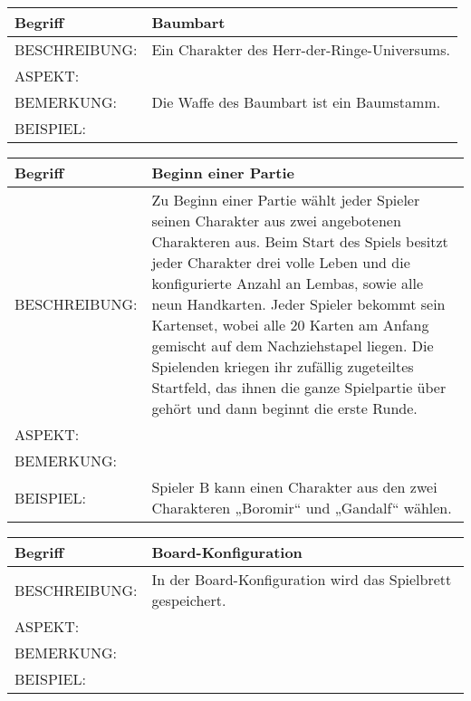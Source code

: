 \documentclass{uulm-assignment}
\begin{document}
	     \begin{tabularx}{\textwidth}{|l|X |} \hline
	        \textbf{Begriff} & \textbf{Baumbart} \\
	        \hline
	        BESCHREIBUNG: & Ein Charakter des Herr-der-Ringe-Universums. \\
	        \hline
	        ASPEKT: &
	        \\
	        \hline
	        BEMERKUNG: & Die Waffe des Baumbart ist ein Baumstamm.\\
	        \hline
	        BEISPIEL: & \\
	        \hline
	    \end{tabularx}

	     \begin{tabularx}{\textwidth}{|l|X |} \hline
	        \textbf{Begriff} & \textbf{Beginn einer Partie} \\
	        \hline
	        BESCHREIBUNG: & Zu Beginn einer Partie wählt jeder Spieler seinen Charakter aus zwei angebotenen Charakteren aus. 
	        Beim Start des Spiels besitzt jeder Charakter drei volle Leben und die konfigurierte Anzahl an Lembas, sowie alle neun Handkarten. Jeder Spieler bekommt sein Kartenset, wobei  alle 20 Karten am Anfang gemischt auf dem Nachziehstapel liegen. Die Spielenden kriegen ihr zufällig zugeteiltes Startfeld, das ihnen die ganze Spielpartie über gehört und dann beginnt die erste Runde. \\
	        \hline
	        ASPEKT: &
	        \\
	        \hline
	        BEMERKUNG: & \\
	        \hline
	        BEISPIEL: & Spieler B kann einen Charakter aus den zwei Charakteren „Boromir“ und „Gandalf“ wählen. \\
	        \hline
	    \end{tabularx}

	\begin{tabularx}{\textwidth}{|l|X |} \hline
	        \textbf{Begriff} & \textbf{Board-Konfiguration} \\
	        \hline
	        BESCHREIBUNG: & In der Board-Konfiguration wird das Spielbrett gespeichert.                            \\
	        \hline
	        ASPEKT: &
	        \\
	        \hline
	        BEMERKUNG: & \\
	        \hline
	        BEISPIEL: & \\
	        \hline
	    \end{tabularx}
\end{document}
